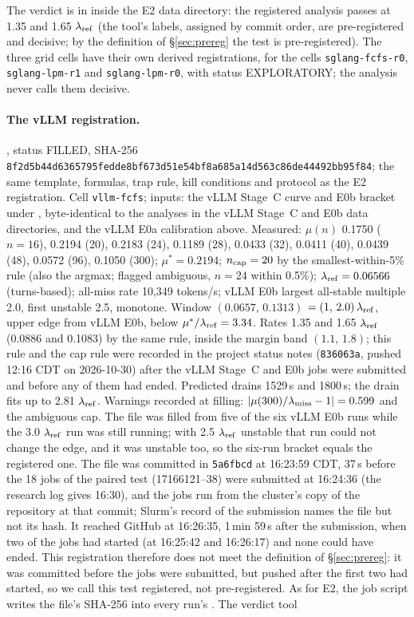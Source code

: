 \noindent The verdict is in  inside the E2 data directory: the registered analysis passes at 1.35 and 1.65 $\lambda_{\mathrm{ref}}$ (the tool's labels, assigned by commit order, are pre-registered and decisive; by the definition of \S\ref{sec:prereg} the test is pre-registered). The three grid cells have their own derived registrations,  for the cells \texttt{sglang-fcfs-r0}, \texttt{sglang-lpm-r1} and \texttt{sglang-lpm-r0}, with status EXPLORATORY; the analysis never calls them decisive.

\paragraph{The vLLM registration.} , status FILLED, SHA-256 \texttt{8f2d5b44d6365795fedde8bf673d51e5\allowbreak 4bf8a685a14d563c86de44492bb95f84}; the same template, formulas, trap rule, kill conditions and protocol as the E2 registration. Cell \texttt{vllm-fcfs}; inputs: the vLLM Stage~C curve and E0b bracket under , byte-identical to the analyses in the vLLM Stage~C and E0b data directories, and the vLLM E0a calibration above. Measured: $\mu(n)$ 0.1750 ($n=16$), 0.2194 (20), 0.2183 (24), 0.1189 (28), 0.0433 (32), 0.0411 (40), 0.0439 (48), 0.0572 (96), 0.1050 (300); $\mu^*=0.2194$; $n_{\mathrm{cap}}=20$ by the smallest-within-5\% rule (also the argmax; flagged ambiguous, $n=24$ within 0.5\%); $\lambda_{\mathrm{ref}}=0.06566$ (turns-based); all-miss rate 10,349 tokens/s; vLLM E0b largest all-stable multiple 2.0, first unstable 2.5, monotone. Window $(0.0657,\,0.1313)$\sps{} $=(1,\,2.0)\,\lambda_{\mathrm{ref}}$, upper edge from vLLM E0b, below $\mu^*/\lambda_{\mathrm{ref}}=3.34$. Rates 1.35 and 1.65 $\lambda_{\mathrm{ref}}$ (0.0886 and 0.1083\sps) by the same rule, inside the margin band $(1.1,\,1.8)$; this rule and the cap rule were recorded in the project status notes (\texttt{836063a}, pushed 12:16 CDT on 2026-10-30) after the vLLM Stage~C and E0b jobs were submitted and before any of them had ended. Predicted drains 1529\,s and 1800\,s; the drain fits up to 2.81 $\lambda_{\mathrm{ref}}$. Warnings recorded at filling: $|\mu(300)/\lambda_{\mathrm{miss}}-1|=0.599$ and the ambiguous cap. The file was filled from five of the six vLLM E0b runs while the 3.0 $\lambda_{\mathrm{ref}}$ run was still running; with 2.5 $\lambda_{\mathrm{ref}}$ unstable that run could not change the edge, and it was unstable too, so the six-run bracket equals the registered one. The file was committed in \texttt{5a6fbcd} at 16:23:59 CDT, 37\,s before the 18 jobs of the paired test (17166121--38) were submitted at 16:24:36 (the research log gives 16:30), and the jobs run from the cluster's copy of the repository at that commit; Slurm's record of the submission names the file but not its hash. It reached GitHub at 16:26:35, 1\,min 59\,s after the submission, when two of the jobs had started (at 16:25:42 and 16:26:17) and none could have ended. This registration therefore does not meet the definition of \S\ref{sec:prereg}: it was committed before the jobs were submitted, but pushed after the first two had started, so we call this test registered, not pre-registered. As for E2, the job script writes the file's SHA-256 into every run's . The verdict tool 